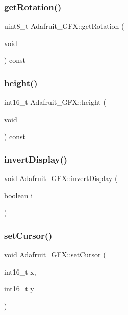 \subsubsection{\texorpdfstring{get\+Rotation()}{getRotation()}}
{\footnotesize\ttfamily uint8\+\_\+t Adafruit\+\_\+\+G\+F\+X\+::get\+Rotation (\begin{DoxyParamCaption}\item[{void}]{ }\end{DoxyParamCaption}) const}

\mbox{\label{class_adafruit___g_f_x_a49da524caa19e5202ed2ed7fd5a3baea}} 
\subsubsection{\texorpdfstring{height()}{height()}}
{\footnotesize\ttfamily int16\+\_\+t Adafruit\+\_\+\+G\+F\+X\+::height (\begin{DoxyParamCaption}\item[{void}]{ }\end{DoxyParamCaption}) const}

\mbox{\label{class_adafruit___g_f_x_a2fa315803f39a5e73b1841874daf0483}} 
\subsubsection{\texorpdfstring{invert\+Display()}{invertDisplay()}}
{\footnotesize\ttfamily void Adafruit\+\_\+\+G\+F\+X\+::invert\+Display (\begin{DoxyParamCaption}\item[{boolean}]{i }\end{DoxyParamCaption})}

\mbox{\label{class_adafruit___g_f_x_aaf96a40cad0f34dd8ec73494b3866c33}} 
\subsubsection{\texorpdfstring{set\+Cursor()}{setCursor()}}
{\footnotesize\ttfamily void Adafruit\+\_\+\+G\+F\+X\+::set\+Cursor (\begin{DoxyParamCaption}\item[{int16\+\_\+t}]{x,  }\item[{int16\+\_\+t}]{y }\end{DoxyParamCaption})}

